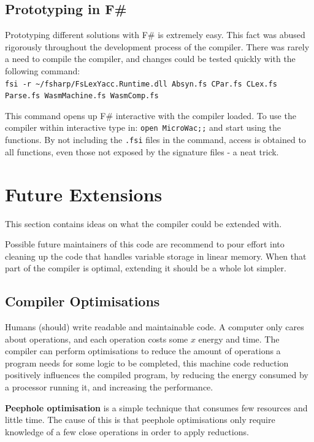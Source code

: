 \documentclass[a4paper]{article}
\begin{document}
\subsection{Prototyping in F\#}
\label{sec:peripherals:prototyping}
Prototyping different solutions with F\# is extremely easy. This fact was abused rigorously throughout the development process of the compiler. There was rarely a need to compile the compiler, and changes could be tested quickly with the following command:\\
\texttt{fsi -r \textasciitilde/fsharp/FsLexYacc.Runtime.dll Absyn.fs CPar.fs CLex.fs Parse.fs WasmMachine.fs WasmComp.fs}

This command opens up F\# interactive with the compiler loaded. To use the compiler within interactive type in: \texttt{open MicroWac;;} and start using the functions. By not including the \texttt{.fsi} files in the command, access is obtained to all functions, even those not exposed by the signature files - a neat trick.

\section{Future Extensions}
\label{sec:extensions}
This section contains ideas on what the compiler could be extended with.

Possible future maintainers of this code are recommend to pour effort into cleaning up the code that handles variable storage in linear memory. When that part of the compiler is optimal, extending it should be a whole lot simpler.

\subsection{Compiler Optimisations}
\label{sec:extensions:optimisations}
Humans (should) write readable and maintainable code. A computer only cares about operations, and each operation costs some $x$ energy and time. The compiler can perform optimisations to reduce the amount of operations a program needs for some logic to be completed, this machine code reduction positively influences the compiled program, by reducing the energy consumed by a processor running it, and increasing the performance.

\textbf{Peephole optimisation} is a simple technique that consumes few resources and little time. The cause of this is that peephole optimisations only require knowledge of a few close operations in order to apply reductions.
\end{document}
